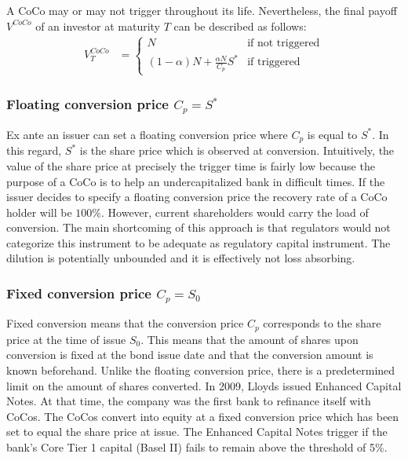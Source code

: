 A CoCo may or may not trigger throughout its life. Nevertheless, the final payoff $V^{CoCo}$ of an investor at maturity $T$ can be described as follows:
\begin{align}\label{valueatmaturity}
    V^{CoCo}_T &= \begin{cases} N & \text{if not triggered} \\ (1 - \alpha) N + \frac{\alpha N}{C_p} S^{*} & \text{if triggered} \end{cases}
\end{align}

\subsubsection*{Floating conversion price $C_p = S^*$}
Ex ante an issuer can set a floating conversion price where $C_p$ is equal to $S^*$. In this regard, $S^*$ is the share price which is observed at conversion. Intuitively, the value of the share price at precisely the trigger time is fairly low because the purpose of a CoCo is to help an undercapitalized bank in difficult times. If the issuer decides to specify a floating conversion price the recovery rate of a CoCo holder will be $100\%$. However, current shareholders would carry the load of conversion. 
The main shortcoming of this approach is that regulators would not categorize this instrument to be adequate as regulatory capital instrument. The dilution is potentially unbounded and it is effectively not loss absorbing. \citep{de2014handbook}

\subsubsection*{Fixed conversion price $C_p = S_0$}
Fixed conversion means that the conversion price $C_p$ corresponds to the share price at the time of issue $S_0$. This means that the amount of shares upon conversion is fixed at the bond issue date and that the conversion amount is known beforehand. Unlike the floating conversion price, there is a predetermined limit on the amount of shares converted. \citep{de2014handbook} In 2009, Lloyds issued Enhanced Capital Notes. At that time, the company was the first bank to refinance itself with CoCos. The CoCos convert into equity at a fixed conversion price which has been set to equal the share price at issue. The Enhanced Capital Notes trigger if the bank's Core Tier 1 capital (Basel II) fails to remain above the threshold of 5\%. \citep{lloyds2009} %

